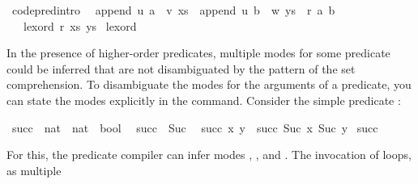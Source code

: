 \begin{isabellebody}
\isamarkupfalse%
\ {\isacharbrackleft}code{\isacharunderscore}pred{\isacharunderscore}intro{\isacharbrackright}{\isacharcolon}\isanewline
\ \ {\isachardoublequoteopen}append\ u\ {\isacharparenleft}a\ {\isacharhash}\ v{\isacharparenright}\ xs\ {\isasymLongrightarrow}\ append\ u\ {\isacharparenleft}b\ {\isacharhash}\ w{\isacharparenright}\ ys\ {\isasymLongrightarrow}\ r\ {\isacharparenleft}a{\isacharcomma}\ b{\isacharparenright}\isanewline
\ \ {\isasymLongrightarrow}\ lexord\ r\ {\isacharparenleft}xs{\isacharcomma}\ ys{\isacharparenright}{\isachardoublequoteclose}\isanewline
{}\isamarkupfalse%
\ lexord%
\endisatagquote
{\isafoldquote}%
%
\isadelimquote
%
\endisadelimquote
%
\isamarkuptrue%
%
\begin{isamarkuptext}%
In the presence of higher-order predicates, multiple modes for some predicate could be inferred
that are not disambiguated by the pattern of the set comprehension.
To disambiguate the modes for the arguments of a predicate, you can state
the modes explicitly in the \hyperlink{command.values}{\mbox{}} command. 
Consider the simple predicate :%
\end{isamarkuptext}%
\isamarkuptrue%
\isamarkupfalse%
\ succ\ {\isacharcolon}{\isacharcolon}\ {\isachardoublequoteopen}nat\ {\isasymRightarrow}\ nat\ {\isasymRightarrow}\ bool{\isachardoublequoteclose}\isanewline
{}\isanewline
\ \ {\isachardoublequoteopen}succ\ {}\ {\isacharparenleft}Suc\ {}{\isacharparenright}{\isachardoublequoteclose}\isanewline
{\isacharbar}\ {\isachardoublequoteopen}succ\ x\ y\ {\isasymLongrightarrow}\ succ\ {\isacharparenleft}Suc\ x{\isacharparenright}\ {\isacharparenleft}Suc\ y{\isacharparenright}{\isachardoublequoteclose}\isanewline
\isanewline
{}\isamarkupfalse%
\ succ%
\isadelimproof
\ %
\endisadelimproof
%
\isatagproof
\isacommand{{\isachardot}}\isamarkupfalse%
%
\endisatagproof
{\isafoldproof}%
%
\isadelimproof
%
\endisadelimproof
%
\begin{isamarkuptext}%
\noindent For this, the predicate compiler can infer modes , ,
   and .
The invocation of \hyperlink{command.values}{\mbox{}}  loops, as multiple

\end{isamarkuptext}
\end{isabellebody}
